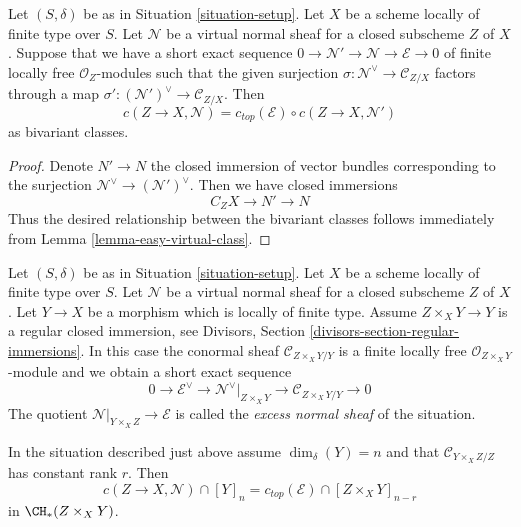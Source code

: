 \begin{lemma}
\label{lemma-gysin-decompose}
Let $(S, \delta)$ be as in Situation \ref{situation-setup}. Let $X$ be a scheme
locally of finite type over $S$. Let $\mathcal{N}$ be a virtual normal
sheaf for a closed subscheme $Z$ of $X$. Suppose that we have a short
exact sequence $0 \to \mathcal{N}' \to \mathcal{N} \to \mathcal{E} \to 0$
of finite locally free $\mathcal{O}_Z$-modules such that the given surjection
$\sigma : \mathcal{N}^\vee \to \mathcal{C}_{Z/X}$ factors through a map
$\sigma' : (\mathcal{N}')^\vee \to \mathcal{C}_{Z/X}$.
Then
$$
c(Z \to X, \mathcal{N}) = c_{top}(\mathcal{E}) \circ c(Z \to X, \mathcal{N}')
$$
as bivariant classes.
\end{lemma}

\begin{proof}
Denote $N' \to N$ the closed immersion of vector bundles corresponding
to the surjection $\mathcal{N}^\vee \to (\mathcal{N}')^\vee$. Then we
have closed immersions
$$
C_ZX \to N' \to N
$$
Thus the desired relationship between the bivariant classes follows
immediately from Lemma \ref{lemma-easy-virtual-class}.
\end{proof}

\noindent
Let $(S, \delta)$ be as in Situation \ref{situation-setup}. Let $X$ be a scheme
locally of finite type over $S$. Let $\mathcal{N}$ be a virtual normal
sheaf for a closed subscheme $Z$ of $X$. Let $Y \to X$ be a morphism
which is locally of finite type. Assume $Z \times_X Y \to Y$ is a
regular closed immersion, see
Divisors, Section \ref{divisors-section-regular-immersions}.
In this case the conormal sheaf $\mathcal{C}_{Z \times_X Y/Y}$ is a finite
locally free $\mathcal{O}_{Z \times_X Y}$-module and we obtain a short
exact sequence
$$
0 \to \mathcal{E}^\vee \to
\mathcal{N}^\vee|_{Z \times_X Y} \to \mathcal{C}_{Z \times_X Y/Y} \to 0
$$
The quotient $\mathcal{N}|_{Y \times_X Z} \to \mathcal{E}$ is called the
{\it excess normal sheaf} of the situation.

\begin{lemma}
\label{lemma-gysin-fundamental}
In the situation described just above assume $\dim_\delta(Y) = n$
and that $\mathcal{C}_{Y \times_X Z/Z}$ has constant rank $r$.
Then
$$
c(Z \to X, \mathcal{N}) \cap [Y]_n =
c_{top}(\mathcal{E}) \cap [Z \times_X Y]_{n - r}
$$
in $\CH_*(Z \times_X Y)$.
\end{lemma}


